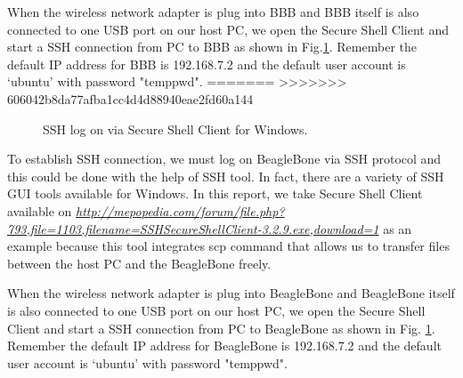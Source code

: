 \documentclass[12pt,journal,draftclsnofoot,onecolumn]{IEEEtran}
\begin{document}
When the wireless network adapter is plug into BBB and BBB itself is also connected to one USB port on our host PC, we open the Secure Shell Client and start a SSH connection from PC to BBB as shown in Fig.\ref{ssh}. Remember the default IP address for BBB is 192.168.7.2 and the default user account is `ubuntu' with password "temppwd".
=======
>>>>>>> 606042b8da77afba1cc4d4d88940eae2fd60a144
\begin{figure}[htb]
	\centering

     \caption{SSH log on via Secure Shell Client for Windows.}\label{ssh}
     \end{figure}
     
To establish SSH connection, we must log on BeagleBone via SSH protocol and this could be done with the help of SSH tool. In fact, there are a variety of SSH GUI tools available for Windows. In this report, we take Secure Shell Client available on \textcolor{blue}{\textit{\url{http://mepopedia.com/forum/file.php?793,file=1103,filename=SSHSecureShellClient-3.2.9.exe,download=1}}}  as an example because this tool integrates scp command that allows us to transfer files between the host PC and the BeagleBone freely.

When the wireless network adapter is plug into BeagleBone and BeagleBone itself is also connected to one USB port on our host PC, we open the Secure Shell Client and start a SSH connection from PC to BeagleBone as shown in Fig. \ref{ssh}. Remember the default IP address for BeagleBone is 192.168.7.2 and the default user account is `ubuntu' with password "temppwd".
\end{document}
